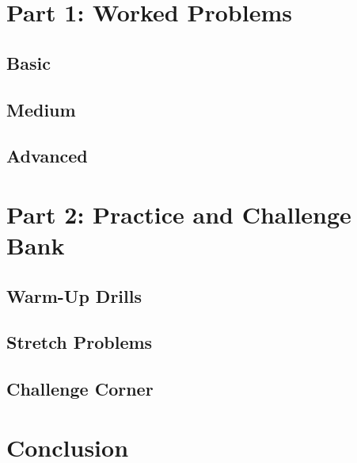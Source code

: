 \documentclass[12pt]{article}
\theoremstyle{definition}
\begin{document}
\section{Part 1: Worked Problems}

\subsection{Basic}


\subsection{Medium}


\subsection{Advanced}


\section{Part 2: Practice and Challenge Bank}

\subsection{Warm-Up Drills}


\subsection{Stretch Problems}


\subsection{Challenge Corner}


\section{Conclusion}
\end{document}
